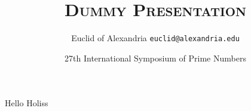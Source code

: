 \documentclass{beamer}
\title{\textsc{Dummy Presentation}}
\date[ISPN ’80]{27th International Symposium of Prime Numbers}
\author[Euclid]{Euclid of Alexandria \texttt{euclid@alexandria.edu}}
\begin{document}
\begin{frame}
\titlepage
\end{frame}

\begin{frame}{Hello}
    Holiss
\end{frame}
\end{document}
